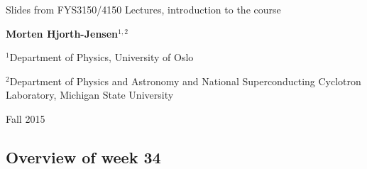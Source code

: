 \documentclass[%
oneside,                 %
final,                   %
10pt]{article}
\begin{document}






\thispagestyle{empty}

\begin{center}
{\LARGE\bf
\begin{spacing}{1.25}
Slides from FYS3150/4150 Lectures, introduction to the course
\end{spacing}
}
\end{center}


\begin{center}
{\bf Morten Hjorth-Jensen${}^{1, 2}$} \\ [0mm]
\end{center}

\begin{center}
\centerline{{\small ${}^1$Department of Physics, University of Oslo}}
\centerline{{\small ${}^2$Department of Physics and Astronomy and National Superconducting Cyclotron Laboratory, Michigan State University}}
\end{center}
    

\begin{center} %
Fall 2015
\end{center}

\vspace{1cm}


\subsection{Overview of week 34}


\end{document}
